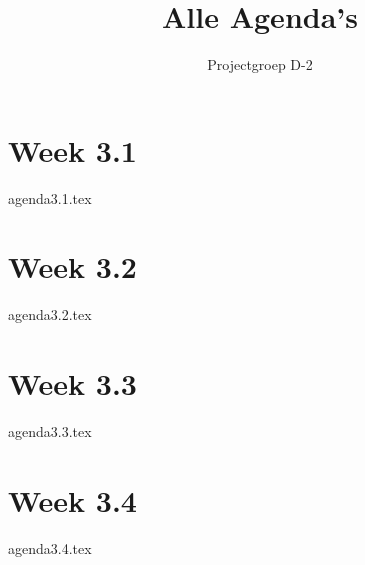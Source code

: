 \documentclass{report}
\title{Alle Agenda's}
\author{Projectgroep D-2}
\begin{document}
\maketitle
\tableofcontents

\chapter{Week 3.1}
{agenda3.1.tex}
\chapter{Week 3.2}
{agenda3.2.tex}
\chapter{Week 3.3}
{agenda3.3.tex}
\chapter{Week 3.4}
{agenda3.4.tex}
\end{document}
